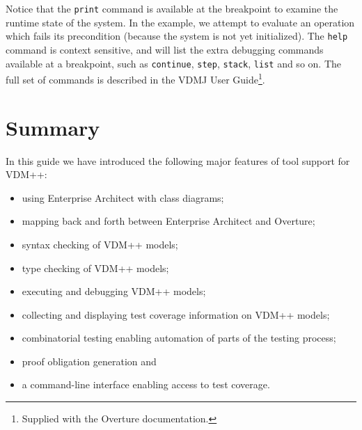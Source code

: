 \noindent Notice that the \verb|print| command is available at the breakpoint
to examine the runtime state of the system. In the example, we attempt to evaluate an
operation which fails its precondition (because the system is not yet
initialized). The \verb|help| command is context sensitive, and will list the
extra debugging commands available at a breakpoint, such as \verb|continue|,
\verb|step|, \verb|stack|, \verb|list| and so on. The full set of commands is
described in the VDMJ User Guide\footnote{Supplied with the Overture
documentation.}.

\lstset{style=mystyle,language=VDM++}

\section{Summary}\label{sec:toolintrosummary}

In this guide we have introduced the following major features of tool
support for VDM++:
\begin{itemize}
\item using Enterprise Architect with class diagrams;
\item mapping back and forth between Enterprise Architect and Overture;
\item syntax checking of VDM++ models;
\item type checking of VDM++ models;
\item executing and debugging VDM++ models;
\item collecting and displaying test coverage information on VDM++
  models;
\item combinatorial testing enabling automation of parts of the
  testing process; 
\item proof obligation generation and
\item a command-line interface enabling access to test coverage.
\end{itemize}
